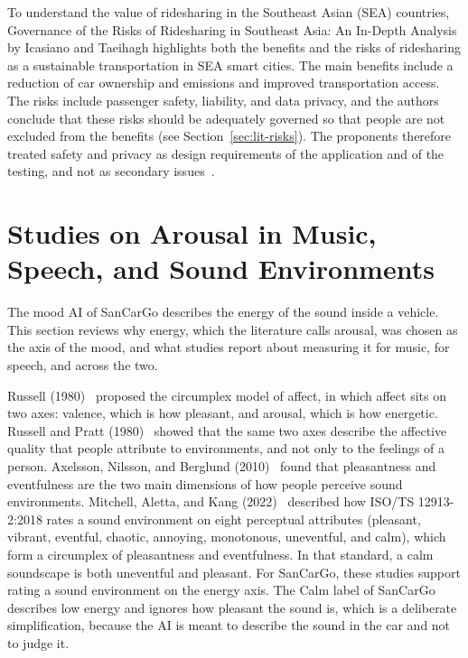 To understand the value of ridesharing in the Southeast Asian (SEA) countries, Governance of the Risks of Ridesharing in Southeast Asia: An In-Depth Analysis by Icasiano and Taeihagh highlights both the benefits and the risks of ridesharing as a sustainable transportation in SEA smart cities. The main benefits include a reduction of car ownership and emissions and improved transportation access. The risks include passenger safety, liability, and data privacy, and the authors conclude that these risks should be adequately governed so that people are not excluded from the benefits (see Section~\ref{sec:lit-risks}). The proponents therefore treated safety and privacy as design requirements of the application and of the testing, and not as secondary issues~\cite{icasiano2021governance}.

\section{Studies on Arousal in Music, Speech, and Sound Environments}
\label{sec:lit-audio}
The mood AI of SanCarGo describes the energy of the sound inside a vehicle. This section reviews why energy, which the literature calls arousal, was chosen as the axis of the mood, and what studies report about measuring it for music, for speech, and across the two.

Russell (1980)~\cite{russell1980circumplex} proposed the circumplex model of affect, in which affect sits on two axes: valence, which is how pleasant, and arousal, which is how energetic. Russell and Pratt (1980)~\cite{russell1980environments} showed that the same two axes describe the affective quality that people attribute to environments, and not only to the feelings of a person. Axelsson, Nilsson, and Berglund (2010)~\cite{axelsson2010principal} found that pleasantness and eventfulness are the two main dimensions of how people perceive sound environments. Mitchell, Aletta, and Kang (2022)~\cite{mitchell2022soundscape} described how ISO/TS 12913-2:2018 rates a sound environment on eight perceptual attributes (pleasant, vibrant, eventful, chaotic, annoying, monotonous, uneventful, and calm), which form a circumplex of pleasantness and eventfulness. In that standard, a calm soundscape is both uneventful and pleasant. For SanCarGo, these studies support rating a sound environment on the energy axis. The Calm label of SanCarGo describes low energy and ignores how pleasant the sound is, which is a deliberate simplification, because the AI is meant to describe the sound in the car and not to judge it.

